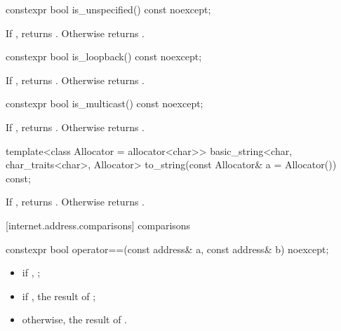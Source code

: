 %
\begin{itemdecl}
constexpr bool is_unspecified() const noexcept;
\end{itemdecl}

\begin{itemdescr}
\pnum
\returns If , returns . Otherwise returns .
\end{itemdescr}

%
\begin{itemdecl}
constexpr bool is_loopback() const noexcept;
\end{itemdecl}

\begin{itemdescr}
\pnum
\returns If , returns . Otherwise returns .
\end{itemdescr}

%
\begin{itemdecl}
constexpr bool is_multicast() const noexcept;
\end{itemdecl}

\begin{itemdescr}
\pnum
\returns If , returns . Otherwise returns .
\end{itemdescr}

%
\begin{itemdecl}
template<class Allocator = allocator<char>>
  basic_string<char, char_traits<char>, Allocator>
    to_string(const Allocator& a = Allocator()) const;
\end{itemdecl}

\begin{itemdescr}
\pnum
\returns If , returns . Otherwise returns .
\end{itemdescr}


%
[internet.address.comparisons]{ comparisons}

\begin{itemdecl}
constexpr bool operator==(const address& a, const address& b) noexcept;
\end{itemdecl}

\begin{itemdescr}
\pnum
\returns
\begin{itemize}
\item
 if , ;
\item
 if , the result of ;
\item
 otherwise, the result of .
\end{itemize}
\end{itemdescr}

